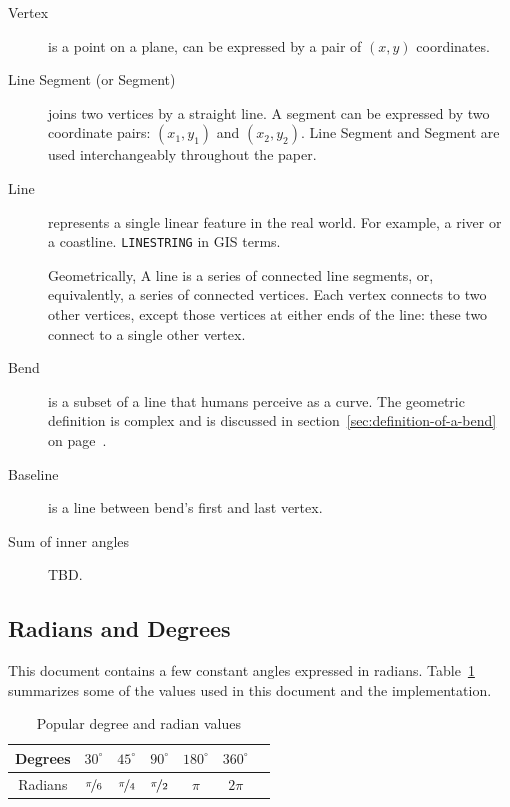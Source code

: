 \documentclass[a4paper]{article}
\newcommand{\onpage}[1]{\ref{#1} on page~\pageref{#1}}
\begin{document}
\begin{description}

    \item[Vertex] is a point on a plane, can be expressed by a pair of $(x,y)$
        coordinates.

    \item[Line Segment (or Segment)] joins two vertices by a straight line. A
        segment can be expressed by two coordinate pairs: $(x_1, y_1)$ and
        $(x_2, y_2)$. Line Segment and Segment are used interchangeably
        throughout the paper.

    \item[Line] represents a single linear feature in the real world. For
        example, a river or a coastline. {\tt LINESTRING} in GIS terms.

        Geometrically, A line is a series of connected line segments, or,
        equivalently, a series of connected vertices. Each vertex connects to
        two other vertices, except those vertices at either ends of the line:
        these two connect to a single other vertex.

    \item[Bend] is a subset of a line that humans perceive as a curve. The
        geometric definition is complex and is discussed in
        section~\onpage{sec:definition-of-a-bend}.

    \item[Baseline] is a line between bend's first and last vertex.

    \item[Sum of inner angles] TBD.

\end{description}

\subsection{Radians and Degrees}

This document contains a few constant angles expressed in radians.
Table~\ref{table:radians} summarizes some of the values used in this document
and the implementation.

\begin{table}[h]
    \centering
    \begin{tabular}{|c|c|c|c|c|c|c|}
        \hline
        Degrees & $30^\circ$          & $45^\circ$          & $90^\circ$          & $180^\circ$ & $360^\circ$ \\
        \hline
        Radians & $\nicefrac{\pi}{6}$ & $\nicefrac{\pi}{4}$ & $\nicefrac{\pi}{2}$ & $\pi$       & $2\pi$ \\
        \hline
    \end{tabular}
    \caption{Popular degree and radian values}
    \label{table:radians}
\end{table}
\end{document}
